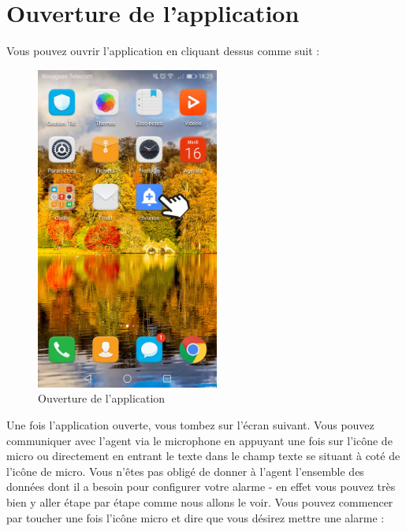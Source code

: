 \section{Ouverture de l'application}

Vous pouvez ouvrir l'application en cliquant dessus comme suit :

\begin{figure}[H]
  \centering
  \includegraphics[width=6cm]{images/A.png}
  \caption{Ouverture de l'application}
\end{figure}

Une fois l'application ouverte, vous tombez sur l'écran suivant. Vous pouvez communiquer avec l'agent via le microphone en appuyant une fois sur l'icône de micro
ou directement en entrant le texte dans le champ texte se situant à coté de l'icône de micro. Vous n'êtes pas obligé de donner à l'agent l'ensemble des données
dont il a besoin pour configurer votre alarme - en effet vous pouvez très bien y aller étape par étape comme nous allons le voir. Vous pouvez commencer par toucher
une fois l'icône micro et dire que vous désirez mettre une alarme :

